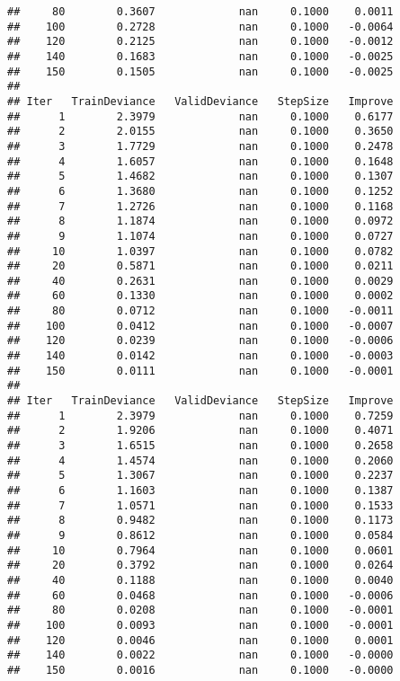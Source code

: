 \documentclass[]{article}
\begin{document}
\begin{verbatim}
##     80        0.3607             nan     0.1000    0.0011
##    100        0.2728             nan     0.1000   -0.0064
##    120        0.2125             nan     0.1000   -0.0012
##    140        0.1683             nan     0.1000   -0.0025
##    150        0.1505             nan     0.1000   -0.0025
## 
## Iter   TrainDeviance   ValidDeviance   StepSize   Improve
##      1        2.3979             nan     0.1000    0.6177
##      2        2.0155             nan     0.1000    0.3650
##      3        1.7729             nan     0.1000    0.2478
##      4        1.6057             nan     0.1000    0.1648
##      5        1.4682             nan     0.1000    0.1307
##      6        1.3680             nan     0.1000    0.1252
##      7        1.2726             nan     0.1000    0.1168
##      8        1.1874             nan     0.1000    0.0972
##      9        1.1074             nan     0.1000    0.0727
##     10        1.0397             nan     0.1000    0.0782
##     20        0.5871             nan     0.1000    0.0211
##     40        0.2631             nan     0.1000    0.0029
##     60        0.1330             nan     0.1000    0.0002
##     80        0.0712             nan     0.1000   -0.0011
##    100        0.0412             nan     0.1000   -0.0007
##    120        0.0239             nan     0.1000   -0.0006
##    140        0.0142             nan     0.1000   -0.0003
##    150        0.0111             nan     0.1000   -0.0001
## 
## Iter   TrainDeviance   ValidDeviance   StepSize   Improve
##      1        2.3979             nan     0.1000    0.7259
##      2        1.9206             nan     0.1000    0.4071
##      3        1.6515             nan     0.1000    0.2658
##      4        1.4574             nan     0.1000    0.2060
##      5        1.3067             nan     0.1000    0.2237
##      6        1.1603             nan     0.1000    0.1387
##      7        1.0571             nan     0.1000    0.1533
##      8        0.9482             nan     0.1000    0.1173
##      9        0.8612             nan     0.1000    0.0584
##     10        0.7964             nan     0.1000    0.0601
##     20        0.3792             nan     0.1000    0.0264
##     40        0.1188             nan     0.1000    0.0040
##     60        0.0468             nan     0.1000   -0.0006
##     80        0.0208             nan     0.1000   -0.0001
##    100        0.0093             nan     0.1000   -0.0001
##    120        0.0046             nan     0.1000    0.0001
##    140        0.0022             nan     0.1000   -0.0000
##    150        0.0016             nan     0.1000   -0.0000

\end{verbatim}
\end{document}
